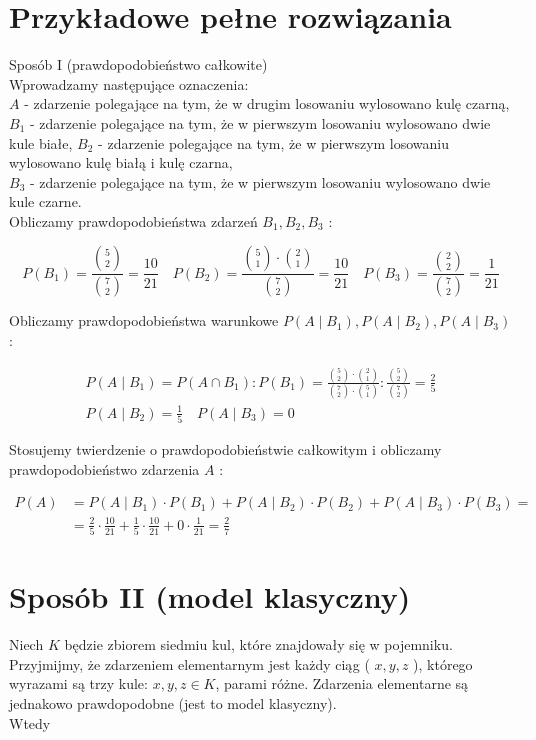 \documentclass[10pt]{article}
\begin{document}
\section*{Przykładowe pełne rozwiązania}
Sposób I (prawdopodobieństwo całkowite)\\
Wprowadzamy następujące oznaczenia:\\
$A$ - zdarzenie polegające na tym, że w drugim losowaniu wylosowano kulę czarną,\\
$B_{1}$ - zdarzenie polegające na tym, że w pierwszym losowaniu wylosowano dwie kule białe, $B_{2}$ - zdarzenie polegające na tym, że w pierwszym losowaniu wylosowano kulę białą i kulę czarna,\\
$B_{3}$ - zdarzenie polegające na tym, że w pierwszym losowaniu wylosowano dwie kule czarne.\\
Obliczamy prawdopodobieństwa zdarzeń $B_{1}, B_{2}, B_{3}$ :

$$
P\left(B_{1}\right)=\frac{\binom{5}{2}}{\binom{7}{2}}=\frac{10}{21} \quad P\left(B_{2}\right)=\frac{\binom{5}{1} \cdot\binom{2}{1}}{\binom{7}{2}}=\frac{10}{21} \quad P\left(B_{3}\right)=\frac{\binom{2}{2}}{\binom{7}{2}}=\frac{1}{21}
$$

Obliczamy prawdopodobieństwa warunkowe $P\left(A \mid B_{1}\right), P\left(A \mid B_{2}\right), P\left(A \mid B_{3}\right)$ :

$$
\begin{gathered}
P\left(A \mid B_{1}\right)=P\left(A \cap B_{1}\right): P\left(B_{1}\right)=\frac{\binom{5}{2} \cdot\binom{2}{1}}{\binom{7}{2} \cdot\binom{5}{1}}: \frac{\binom{5}{2}}{\binom{7}{2}}=\frac{2}{5} \\
P\left(A \mid B_{2}\right)=\frac{1}{5} \quad P\left(A \mid B_{3}\right)=0
\end{gathered}
$$

Stosujemy twierdzenie o prawdopodobieństwie całkowitym i obliczamy prawdopodobieństwo zdarzenia $A$ :

$$
\begin{aligned}
P(A) & =P\left(A \mid B_{1}\right) \cdot P\left(B_{1}\right)+P\left(A \mid B_{2}\right) \cdot P\left(B_{2}\right)+P\left(A \mid B_{3}\right) \cdot P\left(B_{3}\right)= \\
& =\frac{2}{5} \cdot \frac{10}{21}+\frac{1}{5} \cdot \frac{10}{21}+0 \cdot \frac{1}{21}=\frac{2}{7}
\end{aligned}
$$

\section*{Sposób II (model klasyczny)}
Niech $K$ będzie zbiorem siedmiu kul, które znajdowały się w pojemniku. Przyjmijmy, że zdarzeniem elementarnym jest każdy ciąg ( $x, y, z$ ), którego wyrazami są trzy kule: $x, y, z \in K$, parami różne. Zdarzenia elementarne są jednakowo prawdopodobne (jest to model klasyczny).\\
Wtedy
\end{document}
